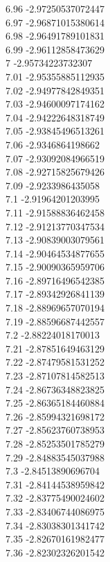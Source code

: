 {6.96	-2.97250537072447\\
6.97	-2.96871015380614\\
6.98	-2.96491789101831\\
6.99	-2.96112858473629\\
7	-2.95734223732307\\
7.01	-2.95355885112935\\
7.02	-2.94977842849351\\
7.03	-2.94600097174162\\
7.04	-2.94222648318749\\
7.05	-2.93845496513261\\
7.06	-2.9346864198662\\
7.07	-2.93092084966519\\
7.08	-2.92715825679426\\
7.09	-2.9233986435058\\
7.1	-2.91964201203995\\
7.11	-2.91588836462458\\
7.12	-2.91213770347534\\
7.13	-2.90839003079561\\
7.14	-2.90464534877655\\
7.15	-2.90090365959706\\
7.16	-2.89716496542385\\
7.17	-2.89342926841139\\
7.18	-2.88969657070194\\
7.19	-2.88596687442557\\
7.2	-2.88224018170013\\
7.21	-2.87851649463129\\
7.22	-2.87479581531252\\
7.23	-2.87107814582513\\
7.24	-2.86736348823825\\
7.25	-2.86365184460884\\
7.26	-2.85994321698172\\
7.27	-2.85623760738953\\
7.28	-2.85253501785279\\
7.29	-2.84883545037988\\
7.3	-2.84513890696704\\
7.31	-2.84144538959842\\
7.32	-2.83775490024602\\
7.33	-2.83406744086975\\
7.34	-2.83038301341742\\
7.35	-2.82670161982477\\
7.36	-2.82302326201542\\
}
